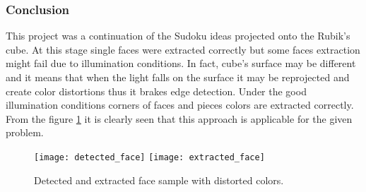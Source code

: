 \documentclass[../../main]{subfiles}
\begin{document}
\subsubsection{Conclusion}

This project was a continuation of the Sudoku ideas projected onto the Rubik's cube. At this stage single faces were extracted correctly but some faces extraction might fail due to illumination conditions. In fact, cube's surface may be different and it means that when the light falls on the surface it may be reprojected and create color distortions thus it brakes edge detection. Under the good illumination conditions corners of faces and pieces colors are extracted correctly.  From the figure \ref{fig:rubiks_cube_face_detected} it is clearly seen that this approach is applicable for the given problem.

\begin{figure} [ht]
    \begin{center}
        \texttt{[image: detected\_face]}
        \texttt{[image: extracted\_face]}
        \caption{Detected and extracted face sample with distorted colors.}
        \label{fig:rubiks_cube_face_detected}
    \end{center}
\end{figure}
\end{document}
